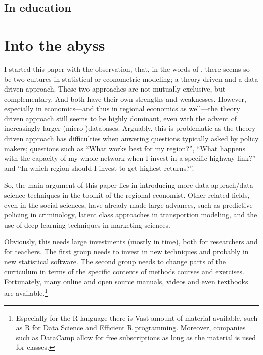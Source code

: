\documentclass[fleqn,10pt]{SelfArx} %
\begin{document}
\subsection{In education}


\citet{schwabish2014economist}

\section{Into the abyss}

I started this paper with the observation, that, in the words of
\citet{breiman2001statistical}, there seems so be two cultures in statistical or
econometric modeling; a theory driven and a data driven approach. These two
approaches are not mutually exclusive, but complementary. And both have their
own strengths and weaknesses. However, especially in economics---and thus in
regional economics as well---the theory driven approach still seems to be highly
dominant, even with the advent of increasingly larger (micro-)databases.
Arguably, this is problematic as the theory driven approach has difficulties when anwering questions typically
asked by policy makers; questions such as ``What works best for my region?'',
``What happens with the capacity of my whole network when I invest in a specific
highway link?'' and ``In which region should I invest to get highest returns?''.

So, the main argument of this paper lies in introducing more data apprach/data
science techniques in the toolkit of the regional economist. Other related fields, even
in the social sciences, have already made large advances, such as predictive
policing in criminology, latent class approaches in transportion modeling, and
the use of deep learning techniques in marketing sciences. 

Obviously, this needs large investments (mostly in time), both for researchers
and for teachers. The first group needs to invest in new techniques and probably
in new statistical software. The second group needs to change parts of the
curriculum in terms of the specific contents of methods courses and exercises.
Fortunately, many online and open source manuals, videos and even textbooks are
available.\footnote{Especially for the R language there is Vast amount of
  material available, such as \href{http://r4ds.had.co.nz/}{R for Data Science}
  and \href{https://csgillespie.github.io/efficientR/}{Efficient R programming}.
Moreover, companies such as DataCamp allow for free subscriptions as long as the
material is used for classes.} 
\end{document}
